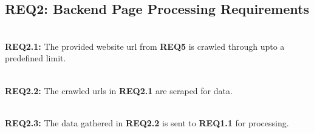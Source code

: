 \subsection{REQ2: Backend Page Processing Requirements}


\textbf{\\REQ2.1:} The provided website url from \textbf{REQ5} is crawled  through upto a predefined limit.\par

\textbf{\\REQ2.2:} The crawled urls in \textbf{REQ2.1} are scraped for data.\par

\textbf{\\REQ2.3:} The data gathered in \textbf{REQ2.2} is sent to \textbf{REQ1.1} for processing.\par


